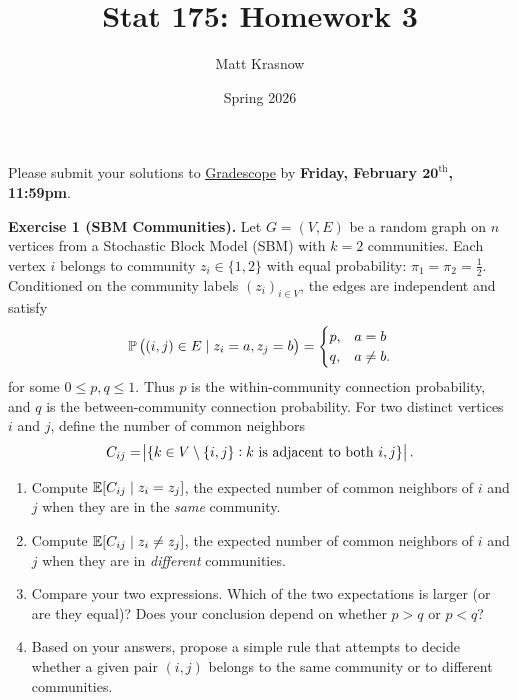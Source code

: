 \documentclass{article}
\title{\textbf{\textsf{Stat 175: Homework 3}}}
\author{\textsf{Matt Krasnow}}
\date{\textsf{Spring 2026}}
\begin{document}
\maketitle

Please submit your solutions to \href{https://www.gradescope.com/courses/1244242}{\underline{Gradescope}} by \textbf{Friday, February $\bm{20}^{\text{th}}$, 11:59pm}.\newpar

\begin{tcolorbox}[colback = gray!16, enhanced, boxrule=0pt, frame hidden, sharp corners, borderline west={3pt}{-1.5pt}{black!80},breakable]
\textbf{Exercise 1 (SBM Communities).} Let $G = (V, E)$ be a random graph on $n$ vertices from a Stochastic Block Model (SBM) with $k = 2$ communities. Each vertex $i$ belongs to community $z_i \in \{1, 2\}$ with equal probability: $\pi_1 = \pi_2 = \tfrac12$. Conditioned on the community labels $(z_i)_{i\in V}$, the edges are independent and satisfy
\begin{align}
    \mathbb{P}\left((i, j) \in E \mid z_i = a, z_j = b\right) = \begin{cases}
p, & a = b\\
q, & a \neq b.
    \end{cases}
\end{align}
for some $0 \leq p, q\leq1$. Thus $p$ is the within-community connection probability, and $q$ is the between-community connection probability. For two distinct vertices $i$ and $j$, define the number of common neighbors
\begin{align}
    C_{ij} = \abs{\{k \in V\setminus\{i, j\} : k \text{ is adjacent to both } i, j \}}.
\end{align}

\begin{enumerate}[$(a)$]
    \item Compute $\mathbb{E}[C_{ij} \mid z_i = z_j]$, the expected number of common neighbors of $i$ and $j$ when they are in the \textit{same} community.
    \item Compute $\mathbb{E}[C_{ij} \mid z_i \neq z_j]$, the expected number of common neighbors of $i$ and $j$ when they are in \textit{different} communities.
    \item Compare your two expressions. Which of the two expectations is larger (or are they equal)? Does your conclusion depend on whether $p>q$ or $p<q$?
    \item Based on your answers, propose a simple rule that attempts to decide whether a given pair $(i,j)$ belongs to the same community or to different communities.
\end{enumerate}
\end{tcolorbox}
\end{document}
